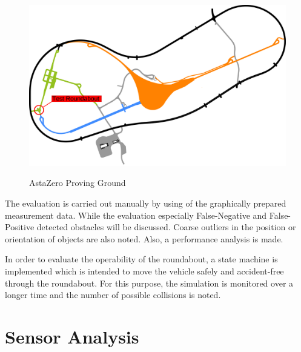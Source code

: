 \documentclass[11pt,oneside,openright]{mpreport}
\begin{document}
\begin{figure}[!ht]
\caption{AstaZero Proving Ground}
\includegraphics[width=\textwidth]{bilder/AstaZero.pdf}
\label{astazero}
\end{figure}


The evaluation is carried out manually by using of the graphically prepared measurement data. 
While the evaluation especially False-Negative and False-Positive detected obstacles will be discussed.
Coarse outliers in the position or orientation of objects are also noted. Also, a performance analysis is made.


In order to evaluate the operability of the roundabout, a state machine is implemented which is intended to move the vehicle safely and accident-free through the roundabout.
For this purpose, the simulation is monitored over a longer time and the number of possible collisions is noted.


\chapter{Sensor Analysis}
\end{document}
